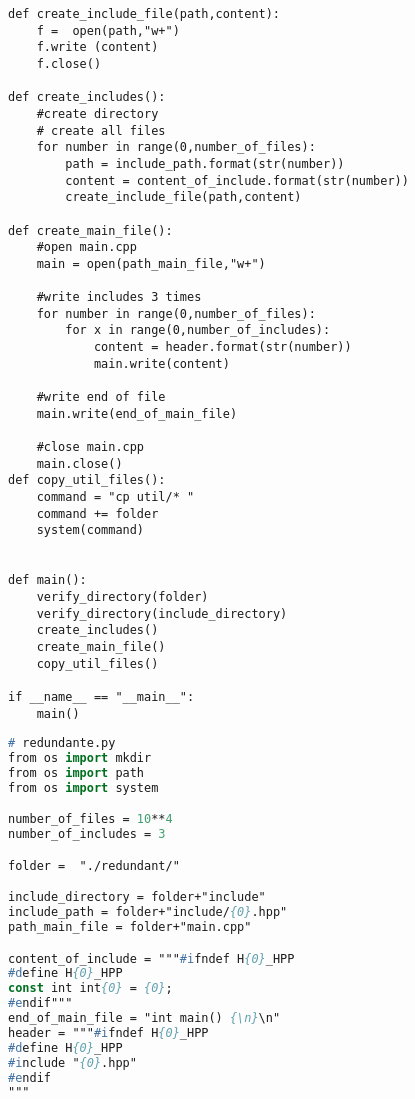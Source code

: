 \begin{apendicesenv}
\begin{lstlisting}
def create_include_file(path,content):
    f =  open(path,"w+")
    f.write (content)
    f.close()

def create_includes():
    #create directory
    # create all files
    for number in range(0,number_of_files):
        path = include_path.format(str(number))
        content = content_of_include.format(str(number))
        create_include_file(path,content)
    
def create_main_file():
    #open main.cpp
    main = open(path_main_file,"w+")

    #write includes 3 times
    for number in range(0,number_of_files):
        for x in range(0,number_of_includes):
            content = header.format(str(number))
            main.write(content)

    #write end of file
    main.write(end_of_main_file)

    #close main.cpp
    main.close()
def copy_util_files():                                                           
    command = "cp util/* "                                                       
    command += folder                                                            
    system(command)                                                              
                      

def main():
    verify_directory(folder)
    verify_directory(include_directory)
    create_includes()
    create_main_file()
    copy_util_files()

if __name__ == "__main__":
    main()
\end{lstlisting}

\begin{lstlisting}[language=Pascal,frame=single,captionpos=b,
                                                caption={
                     Script usando para gerar diretorios com redundancia de Guardas de Inclusão},
                                                            label=script_redundante_include]
# redundante.py
from os import mkdir
from os import path
from os import system

number_of_files = 10**4
number_of_includes = 3

folder =  "./redundant/"

include_directory = folder+"include"
include_path = folder+"include/{0}.hpp"
path_main_file = folder+"main.cpp"

content_of_include = """#ifndef H{0}_HPP
#define H{0}_HPP
const int int{0} = {0};
#endif"""
end_of_main_file = "int main() {\n}\n"
header = """#ifndef H{0}_HPP
#define H{0}_HPP
#include "{0}.hpp"
#endif
"""


\end{lstlisting}
\end{apendicesenv}

